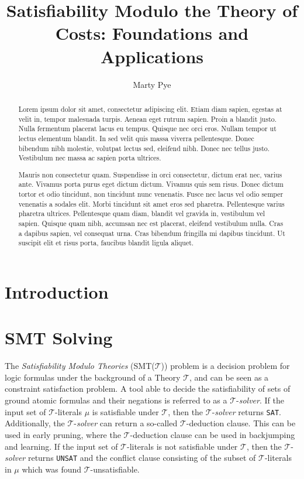 \documentclass{amsart}
\theoremstyle{definition}
\theoremstyle{remark}
\numberwithin{equation}{section}
\def\T{$\mathcal{T}$}
\def\TSolver{$\mathcal{T}$-\emph{solver}}
\def\sat{\texttt{SAT}}
\def\unsat{\texttt{UNSAT}}
\begin{document}
\title[Satisfiability Modulo the Theory of Costs]{Satisfiability Modulo the Theory of Costs: Foundations and Applications}

\author{Marty Pye}
\address{RWTH Aachen University}

\begin{abstract}
Lorem ipsum dolor sit amet, consectetur adipiscing elit. Etiam diam sapien, egestas at velit in, tempor malesuada turpis. Aenean eget rutrum sapien. Proin a blandit justo. Nulla fermentum placerat lacus eu tempus. Quisque nec orci eros. Nullam tempor ut lectus elementum blandit. In sed velit quis massa viverra pellentesque. Donec bibendum nibh molestie, volutpat lectus sed, eleifend nibh. Donec nec tellus justo. Vestibulum nec massa ac sapien porta ultrices.

Mauris non consectetur quam. Suspendisse in orci consectetur, dictum erat nec, varius ante. Vivamus porta purus eget dictum dictum. Vivamus quis sem risus. Donec dictum tortor et odio tincidunt, non tincidunt nunc venenatis. Fusce nec lacus vel odio semper venenatis a sodales elit. Morbi tincidunt sit amet eros sed pharetra. Pellentesque varius pharetra ultrices. Pellentesque quam diam, blandit vel gravida in, vestibulum vel sapien. Quisque quam nibh, accumsan nec est placerat, eleifend vestibulum nulla. Cras a dapibus sapien, vel consequat urna. Cras bibendum fringilla mi dapibus tincidunt. Ut suscipit elit et risus porta, faucibus blandit ligula aliquet.
\end{abstract}

\maketitle

\section{Introduction}
\section{SMT Solving}
The \emph{Satisfiability Modulo Theories} (SMT($\mathcal{T}$)) problem is a decision problem for logic formulas under the background of a Theory $\mathcal{T}$, and can be seen as a constraint satisfaction problem.
A tool able to decide the satisfiability of sets of ground atomic formulas and their negations is referred to as a $\mathcal{T}$-\emph{solver}.
If the input set of \T{}-literals $\mu$ is satisfiable under \T{}, then the \TSolver{} returns \sat{}.
Additionally, the \TSolver{} can return a so-called \T{}-deduction clause. This can be used in early pruning, where the \T{}-deduction clause can be used in backjumping and learning.
If the input set of \T{}-literals is not satisfiable under \T{}, then the \TSolver{} returns \unsat{} and the conflict clause consisting of the subset of \T{}-literals in $\mu$ which was found \T{}-unsatisfiable.
\end{document}
